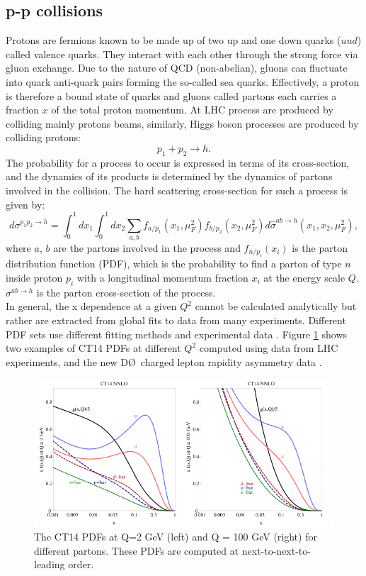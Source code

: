 \subsection{p-p collisions}
\label{chap1:H2012:PP}
Protons are fermions known to be made up of two up and one down quarks ($uud$) called valence quarks. They interact with each other through the strong force via gluon exchange. Due to the nature of QCD (non-abelian), gluons can fluctuate into quark anti-quark pairs forming the so-called sea quarks. Effectively, a proton is therefore a bound state of quarks and gluons called partons each carries a fraction $x$ of the total proton momentum. At LHC process are produced by colliding mainly protons beams, similarly, Higgs boson processes are produced by colliding protons:
\begin{equation}
    p_1 + p_2 \rightarrow h.
\end{equation}
The probability for a process to occur is expressed in terms of its cross-section, and the dynamics of its products is determined by the dynamics of partons involved in the collision. The hard scattering cross-section for such a process is given by:
\begin{equation}
    d \sigma^{p_{1} p_{2} \rightarrow h}=\int_{0}^{1} d x_{1} \int_{0}^{1} d x_{2} \sum_{a, b} f_{a / p_{1}}\left(x_{1}, \mu_{F}^{2}\right) f_{b / p_{2}}\left(x_{2}, \mu_{F}^{2}\right) d \hat{\sigma}^{a b \rightarrow h}\left(x_1, x_2, \mu_{F}^{2}\right), 
\end{equation}
where $a$, $b$ are the partons involved in the process and $f_{n/p_i}(x_i)$ is the parton distribution function (PDF), which is the probability to find a parton of type $n$ inside proton $p_i$ with a longitudinal momentum fraction $x_i$ at the energy scale $Q$. $\sigma^{a b \rightarrow h}$ is the parton cross-section of the process. \\
In general, the x dependence at a given $Q^2$ cannot be calculated analytically but rather are extracted from global fits to data from many experiments. Different PDF sets use different fitting methods and experimental data \cite{PDF}. Figure \ref{fig:chap1:H2012:PDF} shows two examples of CT14 PDFs at different $Q^2$ computed using data from LHC experiments, and the new D\O \ charged lepton rapidity asymmetry data \cite{CT14}. 
\begin{figure}[htbp]
    \centering
    \includegraphics[width=\textwidth]{Ch1/Img/PDFs.png}
    \caption{The CT14 PDFs at Q=2 GeV (left) and Q = 100 GeV (right) for different partons. These PDFs are computed at next-to-next-to-leading order.}
    \label{fig:chap1:H2012:PDF}
\end{figure}

